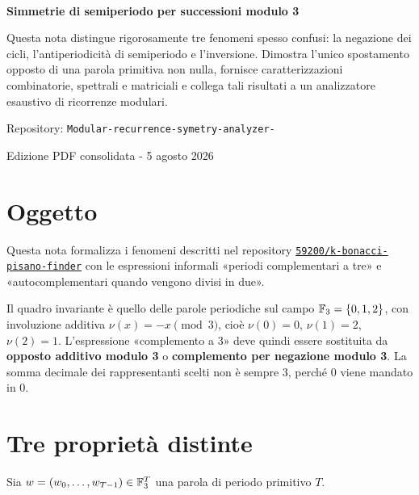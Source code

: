 \documentclass[11pt,a4paper]{article}
\begin{document}
\begin{titlepage}\thispagestyle{empty}\vspace*{22mm}{\color{accent}\rule{\textwidth}{1.2pt}}\\[15mm]{\fontsize{27}{33}\selectfont\bfseries\color{ink}Simmetrie di semiperiodo per successioni modulo 3\par}\vspace{13mm}\begin{summarybox}Questa nota distingue rigorosamente tre fenomeni spesso confusi: la negazione dei cicli, l’antiperiodicità di semiperiodo e l’inversione. Dimostra l’unico spostamento opposto di una parola primitiva non nulla, fornisce caratterizzazioni combinatorie, spettrali e matriciali e collega tali risultati a un analizzatore esaustivo di ricorrenze modulari.\end{summarybox}\vfill{\large\color{muted}Repository: \texttt{Modular-recurrence-symetry-analyzer-}\par}{\large\color{muted}Edizione PDF consolidata - 5 agosto 2026\par}\vspace{12mm}{\color{accent}\rule{\textwidth}{1.2pt}}\end{titlepage}
\renewcommand{\contentsname}{Indice}\tableofcontents\clearpage
\section{Oggetto}
Questa nota formalizza i fenomeni descritti nel repository \href{https://github.com/59200/k-bonacci-pisano-finder}{\texttt{59200/k-bonacci-pisano-finder}} con le espressioni informali «periodi complementari a tre» e «autocomplementari quando vengono divisi in due».

Il quadro invariante è quello delle parole periodiche sul campo \(\mathbb F_3=\{0,1,2\}\), con involuzione additiva \(\nu(x)=-x\pmod3\), cioè \(\nu(0)=0\), \(\nu(1)=2\), \(\nu(2)=1\). L’espressione «complemento a 3» deve quindi essere sostituita da \textbf{opposto additivo modulo 3} o \textbf{complemento per negazione modulo 3}. La somma decimale dei rappresentanti scelti non è sempre 3, perché 0 viene mandato in 0.
\section{Tre proprietà distinte}
Sia \(w=(w_0,\ldots,w_{T-1})\in\mathbb F_3^T\) una parola di periodo primitivo \(T\).
\end{document}
